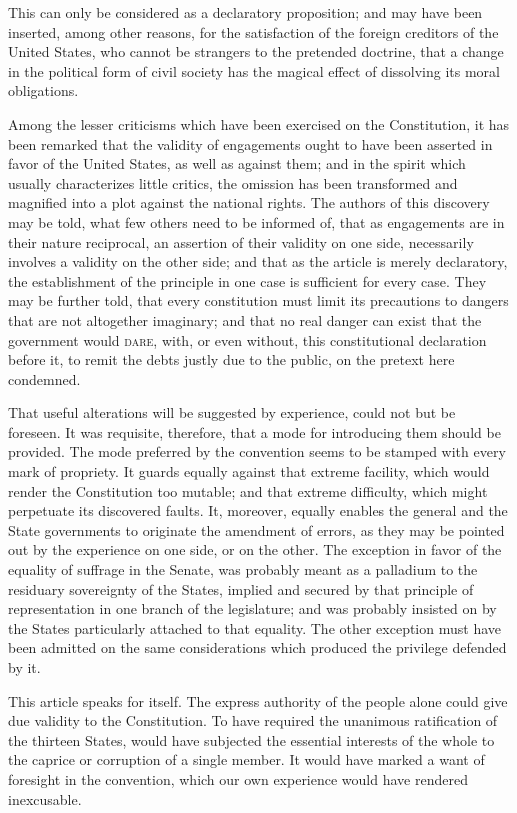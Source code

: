 This can only be considered as a declaratory proposition; and may have been inserted, among other reasons, for the satisfaction of the foreign creditors of the United States, who cannot be strangers to the pretended doctrine, that a change in the political form of civil society has the magical effect of dissolving its moral obligations.

Among the lesser criticisms which have been exercised on the Constitution, it has been remarked that the validity of engagements ought to have been asserted in favor of the United States, as well as against them; and in the spirit which usually characterizes little critics, the omission has been transformed and magnified into a plot against the national rights. The authors of this discovery may be told, what few others need to be informed of, that as engagements are in their nature reciprocal, an assertion of their validity on one side, necessarily involves a validity on the other side; and that as the article is merely declaratory, the establishment of the principle in one case is sufficient for every case. They may be further told, that every constitution must limit its precautions to dangers that are not altogether imaginary; and that no real danger can exist that the government would \textsc{dare}, with, or even without, this constitutional declaration before it, to remit the debts justly due to the public, on the pretext here condemned.

That useful alterations will be suggested by experience, could not but be foreseen. It was requisite, therefore, that a mode for introducing them should be provided. The mode preferred by the convention seems to be stamped with every mark of propriety. It guards equally against that extreme facility, which would render the Constitution too mutable; and that extreme difficulty, which might perpetuate its discovered faults. It, moreover, equally enables the general and the State governments to originate the amendment of errors, as they may be pointed out by the experience on one side, or on the other. The exception in favor of the equality of suffrage in the Senate, was probably meant as a palladium to the residuary sovereignty of the States, implied and secured by that principle of representation in one branch of the legislature; and was probably insisted on by the States particularly attached to that equality. The other exception must have been admitted on the same considerations which produced the privilege defended by it.

This article speaks for itself. The express authority of the people alone could give due validity to the Constitution. To have required the unanimous ratification of the thirteen States, would have subjected the essential interests of the whole to the caprice or corruption of a single member. It would have marked a want of foresight in the convention, which our own experience would have rendered inexcusable.

